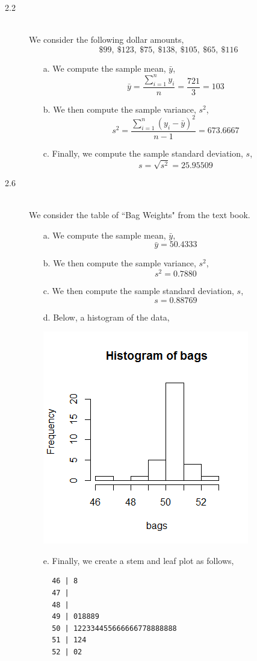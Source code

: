 \documentclass[letterpaper,10pt]{article}
\begin{document}
\begin{description}
\begin{enumerate}
\end{enumerate}
\item[2.2]\hfill\\
We consider the following dollar amounts,
\[\$99,\ \$123,\ \$75,\ \$138,\ \$105,\ \$65,\ \$116\]
\begin{enumerate}
\item[a.] We compute the sample mean, $\bar{y}$,
\[\bar{y}=\frac{\sum_{i=1}^n y_i}{n}=\frac{721}{3}=103\]
\item[b.] We then compute the sample variance, $s^2$,
\[s^2=\frac{\sum_{i=1}^{n}(y_i-\bar{y})^2}{n-1}=673.6667\]
\item[c.] Finally, we compute the sample standard deviation, $s$,
\[s=\sqrt{s^2}=25.95509\]
\end{enumerate}
\item[2.6]\hfill\\
We consider the table of ``Bag Weights" from the text book.\\
\begin{enumerate}
\item[a.] We compute the sample mean, $\bar{y}$,
\[\bar{y}=50.4333\]
\item[b.] We then compute the sample variance, $s^2$,
\[s^2=0.7880\]
\item[c.] We then compute the sample standard deviation, $s$,
\[s=0.88769\]
\item[d.] Below, a histogram of the data,
\begin{center}
\includegraphics{bagshist.png}
\end{center}
\item[e.] Finally, we create a stem and leaf plot as follows,\\
\begin{verbatim}
  46 | 8
  47 | 
  48 | 
  49 | 018889
  50 | 122334455666666778888888
  51 | 124
  52 | 02
\end{verbatim}
\end{enumerate}
\end{description}
\end{document}
